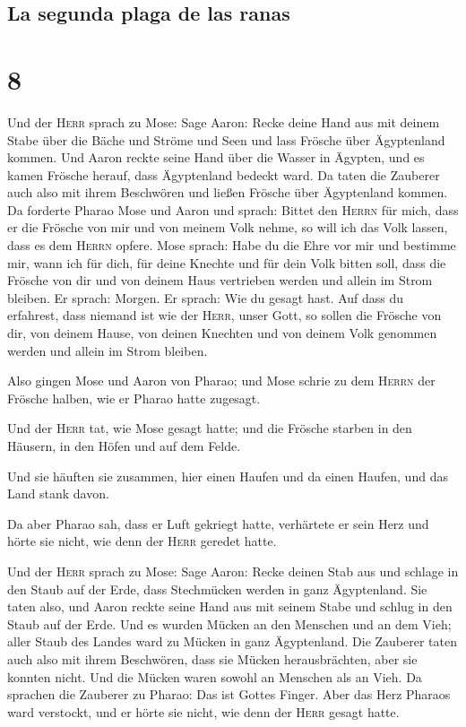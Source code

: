 \hypertarget{la-segunda-plaga-de-las-ranas}{%
\subsection{La segunda plaga de las
ranas}\label{la-segunda-plaga-de-las-ranas}}

\hypertarget{section-7}{%
\section{8}\label{section-7}}

 Und der \textsc{Herr} sprach zu Mose: Sage Aaron: Recke
deine Hand aus mit deinem Stabe über die Bäche und Ströme und Seen und
lass Frösche über Ägyptenland kommen.  Und Aaron reckte
seine Hand über die Wasser in Ägypten, und es kamen Frösche herauf, dass
Ägyptenland bedeckt ward.  Da taten die Zauberer auch also
mit ihrem Beschwören und ließen Frösche über Ägyptenland kommen.
 Da forderte Pharao Mose und Aaron und sprach: Bittet den
\textsc{Herrn} für mich, dass er die Frösche von mir und von meinem Volk
nehme, so will ich das Volk lassen, dass es dem \textsc{Herrn} opfere.
 Mose sprach: Habe du die Ehre vor mir und bestimme mir,
wann ich für dich, für deine Knechte und für dein Volk bitten soll, dass
die Frösche von dir und von deinem Haus vertrieben werden und allein im
Strom bleiben.  Er sprach: Morgen. Er sprach: Wie du
gesagt hast. Auf dass du erfahrest, dass niemand ist wie der
\textsc{Herr}, unser Gott,  so sollen die Frösche von dir,
von deinem Hause, von deinen Knechten und von deinem Volk genommen
werden und allein im Strom bleiben.

 Also gingen Mose und Aaron von Pharao; und Mose schrie zu
dem \textsc{Herrn} der Frösche halben, wie er Pharao hatte zugesagt.

 Und der \textsc{Herr} tat, wie Mose gesagt hatte; und die
Frösche starben in den Häusern, in den Höfen und auf dem Felde.

 Und sie häuften sie zusammen, hier einen Haufen und da
einen Haufen, und das Land stank davon.

 Da aber Pharao sah, dass er Luft gekriegt hatte,
verhärtete er sein Herz und hörte sie nicht, wie denn der \textsc{Herr}
geredet hatte.

 Und der \textsc{Herr} sprach zu Mose: Sage Aaron: Recke
deinen Stab aus und schlage in den Staub auf der Erde, dass Stechmücken
werden in ganz Ägyptenland.  Sie taten also, und Aaron
reckte seine Hand aus mit seinem Stabe und schlug in den Staub auf der
Erde. Und es wurden Mücken an den Menschen und an dem Vieh; aller Staub
des Landes ward zu Mücken in ganz Ägyptenland.  Die
Zauberer taten auch also mit ihrem Beschwören, dass sie Mücken
herausbrächten, aber sie konnten nicht. Und die Mücken waren sowohl an
Menschen als an Vieh.  Da sprachen die Zauberer zu
Pharao: Das ist Gottes Finger. Aber das Herz Pharaos ward verstockt, und
er hörte sie nicht, wie denn der \textsc{Herr} gesagt hatte.

